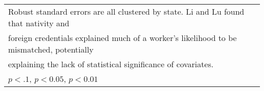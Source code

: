 \begin{table}[htbp]
\begin{tabular}{l*{3}{c}}
\multicolumn{4}{l}{\footnotesize Robust standard errors are all clustered by state. Li and Lu found that nativity and}\\
\multicolumn{4}{l}{\footnotesize foreign credentials explained much of a worker's likelihood to be mismatched, potentially}\\
\multicolumn{4}{l}{\footnotesize explaining the lack of statistical significance of covariates.}\\
\multicolumn{4}{l}{\footnotesize \sym{*} \(p<.1\), \sym{**} \(p<0.05\), \sym{***} \(p<0.01\)}\\
\end{tabular}
\end{table}
